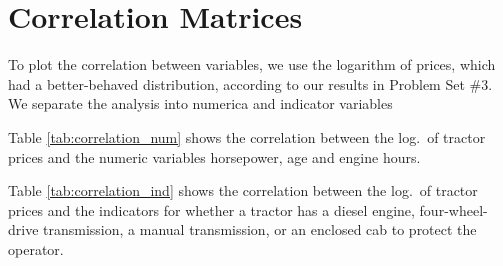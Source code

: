 \documentclass[11pt]{article}
\begin{document}








\pagebreak
\section{Correlation Matrices}
To plot the correlation between variables, 
we use the logarithm of prices, which had a better-behaved distribution, 
according to our results in Problem Set \#3.
We separate the analysis into numerica and indicator variables 


Table \ref{tab:correlation_num} shows the correlation 
between the log.~of tractor prices
and the numeric variables horsepower, age and engine hours.





Table \ref{tab:correlation_ind} shows the correlation 
between the log.~of tractor prices
and the indicators for whether a tractor
has a diesel engine, four-wheel-drive transmission, a manual transmission, 
or an enclosed cab to protect the operator. 





\end{document}
